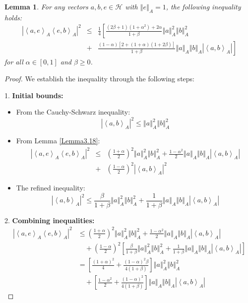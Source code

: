 \documentclass{article}
\newcommand{\seqA}[1]{{\left<#1\right>}_{A}}
\newcommand{\normA}[1]{{\left\Vert#1\right\Vert}_{A}}
\newcommand{\abs}[1]{\left\vert#1\right\vert}
\newcommand {\h}{\mathcal{H}}
\newtheorem{lemma}[theorem]{Lemma}
\begin{document}
\begin{lemma}\label{Lemma2.4}
For any vectors $a,b,e \in \h$ with $\normA{e} = 1$, the following inequality holds:
\begin{eqnarray}\label{eq:main_inequality}
  \abs{\seqA{a,e}\seqA{e,b}}^2 &\leq&\frac{1}{4}\left[\frac{(2\beta+1)(1+\alpha^2)+2\alpha}{1+\beta}\normA{a}^2\normA{b}^2\right.\nonumber \\
  &+&\left.\frac{(1-\alpha)[2+(1+\alpha)(1+2\beta)]}{1+\beta}\normA{a}\normA{b}\abs{\seqA{a,b}}\right]
\end{eqnarray}
for all $\alpha \in [0,1]$ and $\beta \geq 0$.
\end{lemma}
\begin{proof}
We establish the inequality through the following steps:

1. \textbf{Initial bounds:}
\begin{itemize}
\item From the Cauchy-Schwarz inequality:
\begin{equation}\label{eq:cauchy_schwarz}
\abs{\seqA{a,b}}^2 \leq \normA{a}^2\normA{b}^2
\end{equation}

\item From Lemma \ref{Lemma3.18}:
\begin{eqnarray}\label{eq:lemma318}
  \abs{\seqA{a,e}\seqA{e,b}}^2 &\leq&\left(\frac{1+\alpha}{2}\right)^2\normA{a}^2\normA{b}^2 + \frac{1-\alpha^2}{2}\normA{a}\normA{b}\abs{\seqA{a,b}} \nonumber \\
  &+&\left(\frac{1-\alpha}{2}\right)^2\abs{\seqA{a,b}}^2
\end{eqnarray}
\item The refined inequality:
\begin{equation}\label{eq:refined}
\abs{\seqA{a,b}}^2 \leq \frac{\beta}{1+\beta}\normA{a}^2\normA{b}^2 + \frac{1}{1+\beta}\normA{a}\normA{b}\abs{\seqA{a,b}}
\end{equation}
\end{itemize}

2. \textbf{Combining inequalities:}
\begin{align*}
\abs{\seqA{a,e}\seqA{e,b}}^2
&\leq \left(\frac{1+\alpha}{2}\right)^2\normA{a}^2\normA{b}^2 + \frac{1-\alpha^2}{2}\normA{a}\normA{b}\abs{\seqA{a,b}} \\
&\quad + \left(\frac{1-\alpha}{2}\right)^2\left[\frac{\beta}{1+\beta}\normA{a}^2\normA{b}^2 + \frac{1}{1+\beta}\normA{a}\normA{b}\abs{\seqA{a,b}}\right] \\
&= \left[\frac{(1+\alpha)^2}{4} + \frac{(1-\alpha)^2\beta}{4(1+\beta)}\right]\normA{a}^2\normA{b}^2 \\
&\quad + \left[\frac{1-\alpha^2}{2} + \frac{(1-\alpha)^2}{4(1+\beta)}\right]\normA{a}\normA{b}\abs{\seqA{a,b}}
\end{align*}


\end{proof}
\end{document}
